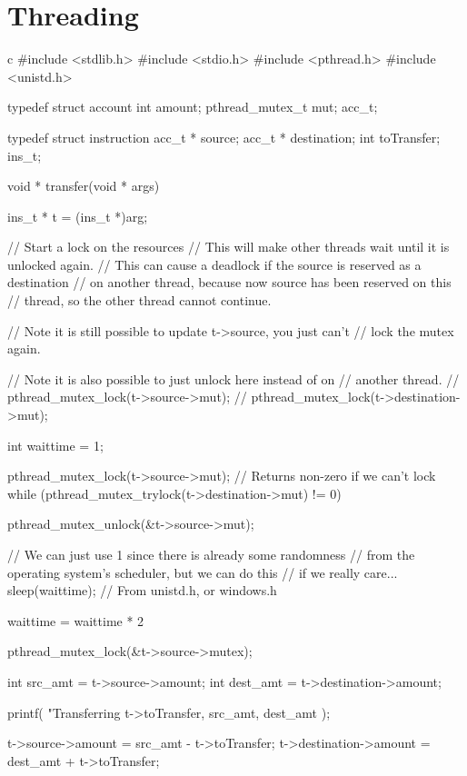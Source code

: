 \section{Threading}\label{sec:threading}

\begin{code}{c}
#include <stdlib.h>
#include <stdio.h>
#include <pthread.h>
#include <unistd.h>

typedef struct account {
    int amount;
    pthread_mutex_t mut;
} acc_t;

typedef struct instruction {
    acc_t * source;
    acc_t * destination;
    int toTransfer;
} ins_t;
 
void * transfer(void * args) {
    ins_t * t = (ins_t *)arg;

    // Start a lock on the resources
    // This will make other threads wait until it is unlocked again.
    // This can cause a deadlock if the source is reserved as a destination
    // on another thread, because now source has been reserved on this
    // thread, so the other thread cannot continue.

    // Note it is still possible to update t->source, you just can't
    // lock the mutex again.

    // Note it is also possible to just unlock here instead of on
    // another thread.
    // pthread_mutex_lock(t->source->mut);
    // pthread_mutex_lock(t->destination->mut);

    int waittime = 1;

    pthread_mutex_lock(t->source->mut);
    // Returns non-zero if we can't lock
    while (pthread_mutex_trylock(t->destination->mut) != 0) {
        pthread_mutex_unlock(&t->source->mut);

        // We can just use 1 since there is already some randomness
        // from the operating system's scheduler, but we can do this
        // if we really care...
        sleep(waittime); // From unistd.h, or windows.h

        waittime = waittime * 2

        pthread_mutex_lock(&t->source->mutex);
    }

    int src_amt = t->source->amount;
    int dest_amt = t->destination->amount;

    printf(
        "Transferring %
        t->toTransfer,
        src_amt,
        dest_amt
    );

    t->source->amount = src_amt - t->toTransfer;
    t->destination->amount = dest_amt + t->toTransfer;

}
\end{code}
